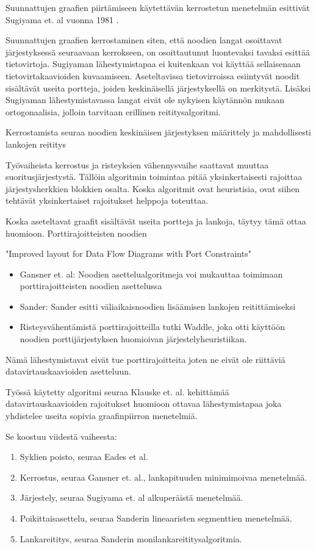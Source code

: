 \documentclass[finnish,12pt]{article}
\begin{document}
Suunnattujen graafien piirtämiseen käytettävän kerrostetun menetelmän
esittivät Sugiyama et. al vuonna 1981 \cite{RefWorks:9}.

Suunnattujen graafien kerrostaminen siten, että noodien langat osoittavat järjestyksessä seuraavaan kerrokseen,
on osoittautunut luontevaksi tavaksi esittää tietovirtoja. Sugiyaman lähestymistapaa ei kuitenkaan voi käyttää sellaisenaan tietovirtakaavioiden kuvaamiseen. Aseteltavissa tietovirroissa esiintyvät noodit sisältävät useita portteja, joiden keskinäisellä järjestyksellä on merkitystä. Lisäksi Sugiyaman lähestymistavassa langat eivät ole nykyisen käytännön mukaan ortogonaalisia, jolloin tarvitaan erillinen reititysalgoritmi.

Kerrostamista seuraa noodien keskinäisen järjestyksen määrittely ja mahdollisesti lankojen reititys

Työvaiheista kerrostus ja risteyksien vähennysvaihe saattavat muuttaa suoritusjärjestystä.
Tällöin algoritmin toimintaa pitää yksinkertaisesti rajoittaa järjestysherkkien blokkien osalta.
Koska algoritmit ovat heuristisia, ovat siihen tehtävät yksinkertaiset rajoitukset helppoja toteuttaa.

Koska aseteltavat graafit sisältävät useita portteja ja lankoja, täytyy tämä ottaa huomioon. Porttirajoitteisten noodien

"Improved layout for Data Flow Diagrams with Port Constraints"
\begin{itemize}
  \item Gansner et. al: Noodien asettelualgoritmeja voi mukauttaa toimimaan porttirajoitteisten noodien asettelussa
  \item Sander: Sander esitti väliaikaisnoodien lisäämisen lankojen reitittämiseksi
  \item Risteysvähentämistä porttirajoitteilla tutki Waddle, joka otti käyttöön noodien porttijärjestyksen huomioivan järjestelyheuristiikan.
\end{itemize}

Nämä lähestymistavat eivät tue porttirajoitteita joten ne eivät ole riittäviä datavirtauskaavioiden asetteluun.

Työssä käytetty algoritmi seuraa Klauske et. al. kehittämää  datavirtauskaavioiden rajoitukset huomioon ottavaa lähestymistapaa \cite{RefWorks:50} joka yhdistelee useita sopivia graafinpiirron menetelmiä.

Se koostuu viidestä vaiheesta:
\begin{enumerate}
  \item Syklien poisto, seuraa Eades et al.\cite{RefWorks:48}
  \item Kerrostus, seuraa Gansner et. al., lankapituuden minimimoivaa menetelmää. \cite{RefWorks:28}
  \item Järjestely, seuraa Sugiyama et. al alkuperäistä menetelmää. \cite{RefWorks:9}
  \item Poikittaisasettelu, seuraa Sanderin lineaaristen segmenttien menetelmää. \cite{RefWorks:49}
  \item Lankareititys, seuraa Sanderin monilankareititysalgoritmia. \cite{RefWorks:17}
\end{enumerate}
\end{document}
